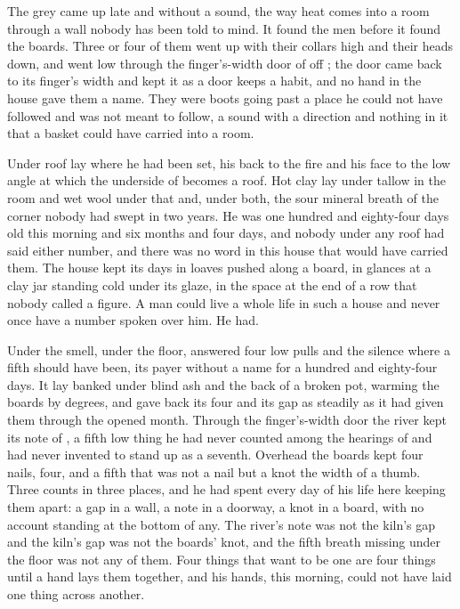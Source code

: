 
The grey came up  late and without a sound, the way heat comes into a room through a wall nobody has been told to mind. It found the men before it found the boards. Three or four of them went up with their collars high and their heads down, and went low through the finger's-width door of  off ; the door came back to its finger's width and kept it as a door keeps a habit, and no hand in the house gave them a name. They were boots going past a place he could not have followed and was not meant to follow, a sound with a direction and nothing in it that a basket could have carried into a room.

Under  roof  lay where he had been set, his back to the fire and his face to the low angle at which the underside of  becomes a roof. Hot clay lay under tallow in the room and wet wool under that and, under both, the sour mineral breath of the corner nobody had swept in two years. He was one hundred and eighty-four days old this morning and six months and four days, and nobody under any roof had said either number, and there was no word in this house that would have carried them. The house kept its days in loaves pushed along a board, in glances at a clay jar standing cold under its glaze, in the space at the end of a row that nobody called a figure. A man could live a whole life in such a house and never once have a number spoken over him. He had.

Under the smell, under the floor,  answered four low pulls and the silence where a fifth should have been, its payer without a name for a hundred and eighty-four days. It lay banked under blind ash and the back of a broken pot, warming the boards by degrees, and gave back its four and its gap as steadily as it had given them through the opened month. Through the finger's-width door the river kept its note of , a fifth low thing he had never counted among the hearings of  and had never invented to stand up as a seventh. Overhead the boards kept four nails, four, and a fifth that was not a nail but a knot the width of a thumb. Three counts in three places, and he had spent every day of his life here keeping them apart: a gap in a wall, a note in a doorway, a knot in a board, with no account standing at the bottom of any. The river's note was not the kiln's gap and the kiln's gap was not the boards' knot, and the fifth breath missing under the floor was not any of them. Four things that want to be one are four things until a hand lays them together, and his hands, this morning, could not have laid one thing across another.

